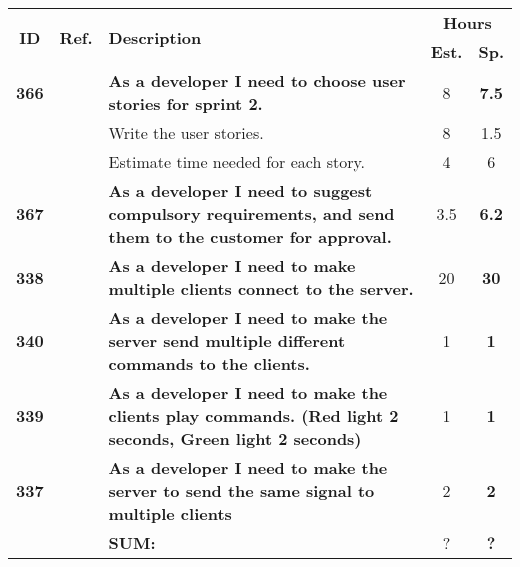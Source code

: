  \label{tab:sprint2stories}
 \def\arraystretch{1.25}
 
\begin{longtable}{ccXcc}
\toprule[1mm]
\multirow{2}{*}{\textbf{ID}} &
\multirow{2}{*}{\textbf{Ref.}} & \multirow{2}{*}{\textbf{Description}} & \multicolumn{2}{c}{\textbf{Hours}} \\
 				& & & \textbf{Est.} & \textbf{Sp.} \\ 				
\midrule
\textbf{366} 	& {M6}
	& {\bf As a developer I need to choose user stories for sprint 2.} 	& 	8	& \textbf{7.5} \\
				&& Write the user stories. 	& 8 &  1.5 \\
				&& Estimate time needed for each story. 	&  4 & 6 \\	

	
\textbf{367} 	& {M6}
	& {\bf As a developer I need to suggest compulsory requirements, and send them to the customer for approval.} 	& 		3.5	& \textbf{6.2} \\

\textbf{338} 	& {M6}
	& {\bf As a developer I need to make multiple clients connect to the server.} 	& 	20		& \textbf{30} \\


\textbf{340} 	& {M6}
	& {\bf As a developer I need to make the server send multiple different commands to the clients. } 	& 		1	& \textbf{1} \\

\textbf{339} 	& {M3}
	& {\bf  As a developer I need to make the clients play commands. (Red light 2 seconds, Green light 2 seconds)} 	& 		1	& \textbf{1} \\

\textbf{337} 	& {M3}
	& {\bf  As a developer I need to make the server to send the same signal to multiple clients} 	& 		2	& \textbf{2} \\
		
				
\hline
				&& \textbf{SUM:}		&		?	& \textbf{?}\\																			
\bottomrule[1mm]
\end{longtable}
